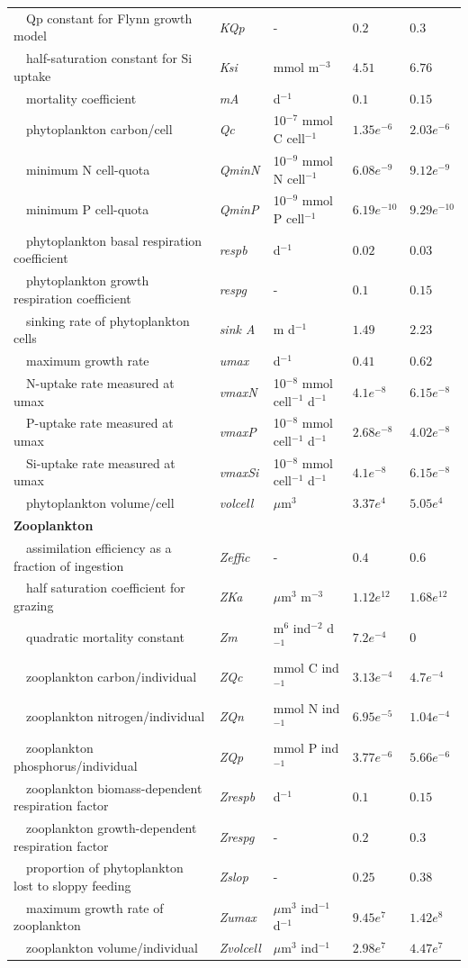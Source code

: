 \documentclass[review]{elsarticle}\usepackage[]{graphicx}\usepackage[]{color}
\begin{document}
\begin{table}[!tbp]
{\begin{center}
\begin{tabular}{lllll}
~~Qp constant for Flynn growth model&\textit{KQp}&-&$0.2$&$0.3$\tabularnewline
~~half-saturation constant for Si uptake&\textit{Ksi}&mmol m$^{-3}$&$4.51$&$6.76$\tabularnewline
~~mortality coefficient&\textit{mA}&d$^{-1}$&$0.1$&$0.15$\tabularnewline
~~phytoplankton carbon/cell&\textit{Qc}&10$^{-7}$ mmol C cell$^{-1}$&$1.35e^{-6}$&$2.03e^{-6}$\tabularnewline
~~minimum N cell-quota&\textit{QminN}&10$^{-9}$ mmol N cell$^{-1}$&$6.08e^{-9}$&$9.12e^{-9}$\tabularnewline
~~minimum P cell-quota&\textit{QminP}&10$^{-9}$ mmol P cell$^{-1}$&$6.19e^{-10}$&$9.29e^{-10}$\tabularnewline
~~phytoplankton basal respiration coefficient&\textit{respb}&d$^{-1}$&$0.02$&$0.03$\tabularnewline
~~phytoplankton growth respiration coefficient&\textit{respg}&-&$0.1$&$0.15$\tabularnewline
~~sinking rate of phytoplankton cells&\textit{sink A}&m d$^{-1}$&$1.49$&$2.23$\tabularnewline
~~maximum growth rate&\textit{umax}&d$^{-1}$&$0.41$&$0.62$\tabularnewline
~~N-uptake rate measured at umax&\textit{vmaxN}&10$^{-8}$ mmol cell$^{-1}$ d$^{-1}$&$4.1e^{-8}$&$6.15e^{-8}$\tabularnewline
~~P-uptake rate measured at umax&\textit{vmaxP}&10$^{-8}$ mmol cell$^{-1}$ d$^{-1}$&$2.68e^{-8}$&$4.02e^{-8}$\tabularnewline
~~Si-uptake rate measured at umax&\textit{vmaxSi}&10$^{-8}$ mmol cell$^{-1}$ d$^{-1}$&$4.1e^{-8}$&$6.15e^{-8}$\tabularnewline
~~phytoplankton volume/cell&\textit{volcell}&$\mu$m$^3$&$3.37e^{4}$&$5.05e^{4}$\tabularnewline
\hline
{\bfseries Zooplankton}&&&&\tabularnewline
~~assimilation efficiency as a fraction of ingestion&\textit{Zeffic}&-&$0.4$&$0.6$\tabularnewline
~~half saturation coefficient for grazing&\textit{ZKa}&$\mu$m$^3$ m$^{-3}$&$1.12e^{12}$&$1.68e^{12}$\tabularnewline
~~quadratic mortality constant&\textit{Zm}&m$^6$ ind$^{-2}$ d$^{-1}$&$7.2e^{-4}$&$0$\tabularnewline
~~zooplankton carbon/individual&\textit{ZQc}&mmol C ind$^{-1}$&$3.13e^{-4}$&$4.7e^{-4}$\tabularnewline
~~zooplankton nitrogen/individual&\textit{ZQn}&mmol N ind$^{-1}$&$6.95e^{-5}$&$1.04e^{-4}$\tabularnewline
~~zooplankton phosphorus/individual&\textit{ZQp}&mmol P ind$^{-1}$&$3.77e^{-6}$&$5.66e^{-6}$\tabularnewline
~~zooplankton biomass-dependent respiration factor&\textit{Zrespb}&d$^{-1}$&$0.1$&$0.15$\tabularnewline
~~zooplankton growth-dependent respiration factor&\textit{Zrespg}&-&$0.2$&$0.3$\tabularnewline
~~proportion of phytoplankton lost to sloppy feeding&\textit{Zslop}&-&$0.25$&$0.38$\tabularnewline
~~maximum growth rate of zooplankton&\textit{Zumax}&$\mu$m$^3$ ind$^{-1}$ d$^{-1}$&$9.45e^{7}$&$1.42e^{8}$\tabularnewline
~~zooplankton volume/individual&\textit{Zvolcell}&$\mu$m$^3$ ind$^{-1}$&$2.98e^{7}$&$4.47e^{7}$\tabularnewline

\end{tabular}
\end{center}}
\end{table}
\end{document}
